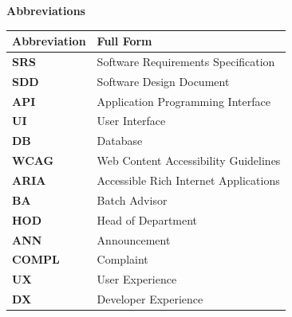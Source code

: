 
\newpage
\thispagestyle{plain}

\begin{center}
\textbf{\LARGE Abbreviations}
\end{center}

\vspace{1cm}

\begin{table}[h]
\centering
\renewcommand{\arraystretch}{1.4}
\begin{tabularx}{\textwidth}{|p{3cm}|X|}
\hline
\textbf{Abbreviation} & \textbf{Full Form} \\
\hline
\textbf{SRS} & Software Requirements Specification \\ \hline
\textbf{SDD} & Software Design Document \\ \hline
\textbf{API} & Application Programming Interface \\ \hline
\textbf{UI} & User Interface \\ \hline
\textbf{DB} & Database \\ \hline
\textbf{WCAG} & Web Content Accessibility Guidelines \\ \hline
\textbf{ARIA} & Accessible Rich Internet Applications \\ \hline
\textbf{BA} & Batch Advisor \\ \hline
\textbf{HOD} & Head of Department \\ \hline
\textbf{ANN} & Announcement \\ \hline
\textbf{COMPL} & Complaint \\ \hline
\textbf{UX} & User Experience \\ \hline
\textbf{DX} & Developer Experience \\ \hline
\end{tabularx}
\end{table}

\newpage
